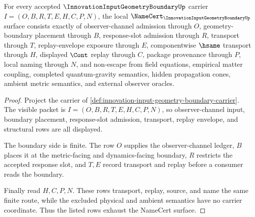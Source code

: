 \begin{theorem}
\label{thm:innovation-input-geometry-boundary-namecert-obligations}
For every accepted $\InnovationInputGeometryBoundaryUp$ carrier $I=(O,B,R,T,E,H,C,P,N)$, the local $\NameCert_{\InnovationInputGeometryBoundaryUp}$ surface consists exactly of observer-channel admission through $O$, geometry-boundary placement through $B$, response-slot admission through $R$, transport through $T$, replay-envelope exposure through $E$, componentwise $\hsame$ transport through $H$, displayed $\Cont$ replay through $C$, package provenance through $P$, local naming through $N$, and non-escape from field equations, empirical matter coupling, completed quantum-gravity semantics, hidden propagation cones, ambient metric semantics, and external observer oracles.
\end{theorem}
\begin{proof}
Project the carrier of \autoref{def:innovation-input-geometry-boundary-carrier}. The visible packet is $I=(O,B,R,T,E,H,C,P,N)$, so observer-channel input, boundary placement, response-slot admission, transport, replay envelope, and structural rows are all displayed.

The boundary side is finite. The row $O$ supplies the observer-channel ledger, $B$ places it at the metric-facing and dynamics-facing boundary, $R$ restricts the accepted response slot, and $T,E$ record transport and replay before a consumer reads the boundary.

Finally read $H,C,P,N$. These rows transport, replay, source, and name the same finite route, while the excluded physical and ambient semantics have no carrier coordinate. Thus the listed rows exhaust the NameCert surface.
\end{proof}

